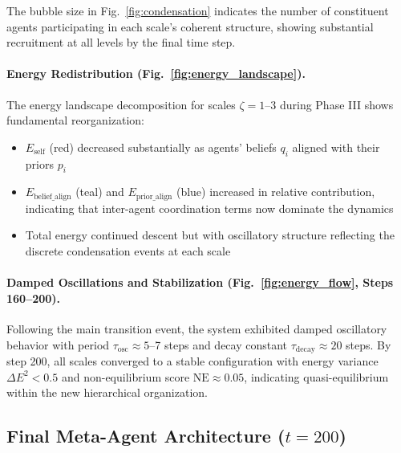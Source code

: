 \documentclass[11pt]{article}
\begin{document}
The bubble size in Fig.~\ref{fig:condensation} indicates the number of constituent agents participating in each scale's coherent structure, showing substantial recruitment at all levels by the final time step.

\paragraph{Energy Redistribution (Fig.~\ref{fig:energy_landscape}).}
The energy landscape decomposition for scales $\zeta = 1$--3 during Phase III shows fundamental reorganization:
\begin{itemize}
\item $E_{\text{self}}$ (red) decreased substantially as agents' beliefs $q_i$ aligned with their priors $p_i$
\item $E_{\text{belief\_align}}$ (teal) and $E_{\text{prior\_align}}$ (blue) increased in relative contribution, indicating that inter-agent coordination terms now dominate the dynamics
\item Total energy continued descent but with oscillatory structure reflecting the discrete condensation events at each scale
\end{itemize}

\paragraph{Damped Oscillations and Stabilization (Fig.~\ref{fig:energy_flow}, Steps 160--200).}
Following the main transition event, the system exhibited damped oscillatory behavior with period $\tau_{\text{osc}} \approx 5$--7 steps and decay constant $\tau_{\text{decay}} \approx 20$ steps. By step 200, all scales converged to a stable configuration with energy variance $\Delta E^2 < 0.5$ and non-equilibrium score $\mathrm{NE} \approx 0.05$, indicating quasi-equilibrium within the new hierarchical organization.

\subsection{Final Meta-Agent Architecture ($t = 200$)}
\end{document}
